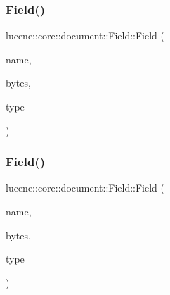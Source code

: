 \mbox{\label{classlucene_1_1core_1_1document_1_1Field_aa5b5549c89b6da80093ffa9ba4f218f8}} 
\subsubsection{\texorpdfstring{Field()}{Field()}\hspace{0.1cm}{\footnotesize\ttfamily [6/11]}}
{\footnotesize\ttfamily lucene\+::core\+::document\+::\+Field\+::\+Field (\begin{DoxyParamCaption}\item[{\mbox{\hyperlink{ZlibCrc32_8h_a2c212835823e3c54a8ab6d95c652660e}{const}} std\+::string \&}]{name,  }\item[{\mbox{\hyperlink{ZlibCrc32_8h_a2c212835823e3c54a8ab6d95c652660e}{const}} \mbox{\hyperlink{classlucene_1_1core_1_1util_1_1BytesRef}{lucene\+::core\+::util\+::\+Bytes\+Ref}} \&}]{bytes,  }\item[{\mbox{\hyperlink{ZlibCrc32_8h_a2c212835823e3c54a8ab6d95c652660e}{const}} \mbox{\hyperlink{classlucene_1_1core_1_1document_1_1FieldType}{Field\+Type}} \&}]{type }\end{DoxyParamCaption})\hspace{0.3cm}{\ttfamily [inline]}}

\mbox{\label{classlucene_1_1core_1_1document_1_1Field_a53623937bdf694c7d4e359842b9c7673}} 
\subsubsection{\texorpdfstring{Field()}{Field()}\hspace{0.1cm}{\footnotesize\ttfamily [7/11]}}
{\footnotesize\ttfamily lucene\+::core\+::document\+::\+Field\+::\+Field (\begin{DoxyParamCaption}\item[{\mbox{\hyperlink{ZlibCrc32_8h_a2c212835823e3c54a8ab6d95c652660e}{const}} std\+::string \&}]{name,  }\item[{\mbox{\hyperlink{classlucene_1_1core_1_1util_1_1BytesRef}{lucene\+::core\+::util\+::\+Bytes\+Ref}} \&\&}]{bytes,  }\item[{\mbox{\hyperlink{ZlibCrc32_8h_a2c212835823e3c54a8ab6d95c652660e}{const}} \mbox{\hyperlink{classlucene_1_1core_1_1document_1_1FieldType}{Field\+Type}} \&}]{type }\end{DoxyParamCaption})\hspace{0.3cm}{\ttfamily [inline]}}


